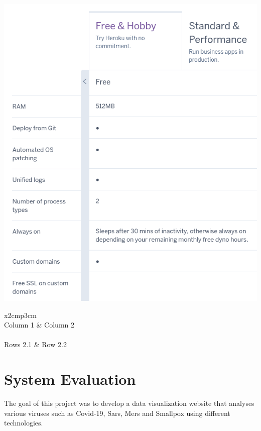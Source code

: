 \begin{center}    
      \includegraphics[scale=0.6]{img/HerokuStats.PNG}
\end{center}

\begin{table}[ht]
  \centering
  \begin{tabular}{x{2cm}p{3cm}}
    \toprule \\
    Column 1 & Column 2 \\
    \midrule \\
    Rows 2.1 & Row 2.2 \\
    \bottomrule
  \end{tabular}
  \caption{A table.}
  \label{table:mytable}
\end{table}

\chapter{System Evaluation}
The goal of this project was to develop a data visualization website that analyses various viruses such as Covid-19, Sars, Mers and Smallpox using different technologies. 

